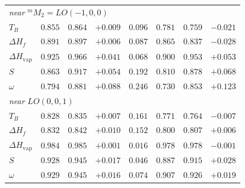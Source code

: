 \documentclass[a5paper, 10pt]{article}
\theoremstyle{plain}
\theoremstyle{remark}
\theoremstyle{definition}
\begin{document}
\begin{table}[H]
\begin{tabular}{lrrrrrrr}
\midrule
\multicolumn{8}{l}{\emph{near} ${}^{m}\!M_2 = LO(-1,0,0)$}\\
$T_B$ & $0.855$ & $0.864$ & $+0.009$ & $0.096$ & $0.781$ & $0.759$ & $-0.021$\\
$\Delta H_f$ & $0.891$ & $0.897$ & $+0.006$ & $0.087$ & $0.865$ & $0.837$ & $-0.028$\\
$\Delta H_{\mathrm{vap}}$ & $0.925$ & $0.966$ & $+0.041$ & $0.068$ & $0.900$ & $0.953$ & $+0.053$\\
$S$ & $0.863$ & $0.917$ & $+0.054$ & $0.192$ & $0.810$ & $0.878$ & $+0.068$\\
$\omega$ & $0.794$ & $0.881$ & $+0.088$ & $0.246$ & $0.730$ & $0.853$ & $+0.123$\\
\midrule
\multicolumn{8}{l}{\emph{near} $LO(0,0,1)$}\\
$T_B$ & $0.828$ & $0.835$ & $+0.007$ & $0.161$ & $0.771$ & $0.764$ & $-0.007$\\
$\Delta H_f$ & $0.832$ & $0.842$ & $+0.010$ & $0.152$ & $0.800$ & $0.807$ & $+0.006$\\
$\Delta H_{\mathrm{vap}}$ & $0.984$ & $0.985$ & $+0.001$ & $0.016$ & $0.978$ & $0.978$ & $-0.001$\\
$S$ & $0.928$ & $0.945$ & $+0.017$ & $0.046$ & $0.887$ & $0.915$ & $+0.028$\\
$\omega$ & $0.929$ & $0.945$ & $+0.016$ & $0.074$ & $0.907$ & $0.926$ & $+0.019$\\
\bottomrule
\end{tabular}
\end{table}
\end{document}
